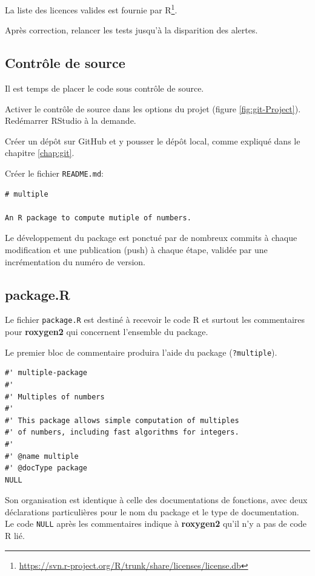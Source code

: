 \documentclass[
  12pt,
  french,
  a4paper,
  extrafontsizes,onecolumn,openright
  ]{memoir}
\begin{document}
La liste des licences valides est fournie par R\footnote{\url{https://svn.r-project.org/R/trunk/share/licenses/license.db}}.

Après correction, relancer les tests jusqu'à la disparition des alertes.

\hypertarget{sec:package-cds}{%
\subsection{Contrôle de source}\label{sec:package-cds}}

Il est temps de placer le code sous contrôle de source.

Activer le contrôle de source dans les options du projet (figure \ref{fig:git-Project}).
Redémarrer RStudio à la demande.

Créer un dépôt sur GitHub et y pousser le dépôt local, comme expliqué dans le chapitre \ref{chap:git}.

Créer le fichier \texttt{README.md}:

\begin{verbatim}
# multiple

An R package to compute mutiple of numbers.
\end{verbatim}

Le développement du package est ponctué par de nombreux commits à chaque modification et une publication (push) à chaque étape, validée par une incrémentation du numéro de version.

\hypertarget{package.r}{%
\subsection{package.R}\label{package.r}}

Le fichier \texttt{package.R} est destiné à recevoir le code R et surtout les commentaires pour \textbf{roxygen2} qui concernent l'ensemble du package.

Le premier bloc de commentaire produira l'aide du package (\texttt{?multiple}).

\begin{verbatim}
#' multiple-package
#'
#' Multiples of numbers
#' 
#' This package allows simple computation of multiples 
#' of numbers, including fast algorithms for integers.
#'
#' @name multiple
#' @docType package
NULL
\end{verbatim}

Son organisation est identique à celle des documentations de fonctions, avec deux déclarations particulières pour le nom du package et le type de documentation.
Le code \texttt{NULL} après les commentaires indique à \textbf{roxygen2} qu'il n'y a pas de code R lié.
\end{document}
